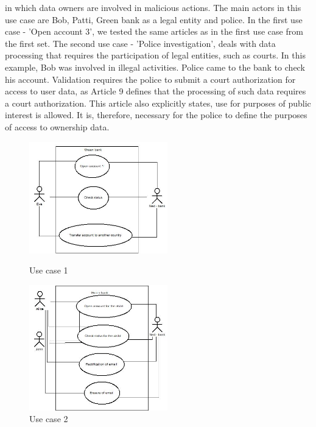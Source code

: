\documentclass[11pt,english]{article}
\begin{document}
in which data owners are involved in malicious actions. The main actors in this use case are Bob, Patti, Green bank as a legal entity and police. In the first use case - 'Open account 3', we tested the same articles as in the first use case from the first set. The second use case - 'Police investigation', deals with data processing that requires the participation of legal entities, such as courts. In this example, Bob was involved in illegal activities. Police came to the bank to check his account. Validation requires the police to submit a court authorization for access to user data, as Article 9 defines that the processing of such data requires a court authorization. This article also explicitly states, use for purposes of public interest is allowed. It is, therefore, necessary for the police to define the purposes of access to ownership data.
\begin{figure}[H]
\centering
\begin{minipage}{.5\textwidth}
  \centering
  \includegraphics[width=6cm,scale=0.5]{images/use case1.jpg}
  \caption{Use case 1}
  \label{fig:usecase1}
\end{minipage}%
\begin{minipage}{.5\textwidth}
  \centering
  \includegraphics[width=6cm,scale=0.5]{images/use case2.jpg}
  \caption{Use case 2}
  \label{fig:usecase2}
\end{minipage}
\end{figure}
\end{document}
